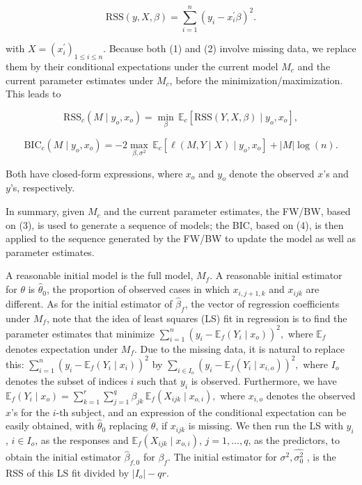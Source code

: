 \documentclass[
  12pt,
]{article}
\begin{document}
\begin{equation}
\text{RSS}(y, X, \beta)
= \sum_{i=1}^{n} (y_i - x_i^\prime \beta)^2. \tag{2}
\end{equation}

with \(X = (x^\prime_i)_{1 \le i \le n}\). Because both (1) and (2)
involve missing data, we replace them by their conditional expectations
under the current model \(M_c\) and the current parameter estimates
under \(M_c\), before the minimization/maximization. This leads to

\begin{equation}
\text{RSS}_c(M \mid y_o, x_o)
= \min_{\beta} \, \mathbb{E}_c \!\left[ \text{RSS}(Y, X, \beta) \mid y_o, x_o \right], \tag{3}
\end{equation}

\begin{equation}
\text{BIC}_c(M \mid y_o, x_o)
= -2 \max_{\beta, \sigma^2} \, \mathbb{E}_c \!\left[ \ell(M, Y \mid X) \mid y_o, x_o \right]
+ |M| \log(n). \tag{4}
\end{equation}

Both have closed-form expressions, where \(x_o\) and \(y_o\)
denote the observed \(x\)'s and \(y\)'s, respectively.

In summary, given \(M_c\) and the current parameter estimates, the
FW/BW, based on (3), is used to generate a sequence of models; the BIC,
based on (4), is then applied to the sequence generated by the FW/BW to
update the model as well as parameter estimates.

A reasonable initial model is the full model, \(M_f\). A reasonable
initial estimator for \(\theta\) is \(\hat{\theta}_0\), the proportion
of observed cases in which \(x_{i,j+1,k}\) and \(x_{ijk}\) are
different. As for the initial estimator of \(\hat{\beta}_f\), the vector
of regression coefficients under \(M_f\), note that the idea of least
squares (LS) fit in regression is to find the parameter estimates that
minimize \(\sum_{i=1}^{n} (y_i - \mathbb{E}_f(Y_i \mid x_o))^2,\) where
\(\mathbb{E}_f\) denotes expectation under \(M_f\). Due to the missing
data, it is natural to replace this:
\(\sum_{i=1}^{n} (y_i - \mathbb{E}_f(Y_i \mid x_i))^2\) by
\(\sum_{i \in I_o} (y_i - \mathbb{E}_f(Y_i \mid x_{i,o}))^2,\) where
\(I_o\) denotes the subset of indices \(i\) such that \(y_i\) is
observed. Furthermore, we have
\(\mathbb{E}_f(Y_i \mid x_{o})= \sum_{k=1}^{r} \sum_{j=1}^{q} \beta_{jk} \, \mathbb{E}_f(X_{ijk} \mid x_{o,i}),\)
where \(x_{i,o}\) denotes the observed \(x\)'s for the \(i\)-th subject,
and an expression of the conditional expectation can be easily obtained,
with \(\hat{\theta}_0\) replacing \(\theta\), if \(x_{ijk}\) is missing.
We then run the LS with \(y_i\), \(i \in I_o\), as the responses and
\(\mathbb{E}_f(X_{ijk} \mid x_{o,i})\), \(j = 1, \ldots, q\), as the
predictors, to obtain the initial estimator \(\hat{\beta}_{f,0}\) for
\(\beta_f\). The initial estimator for \(\sigma^2 , \hat{\sigma^2_0}\) ,
is the RSS of this LS fit divided by \(|I_o| - qr\).
\end{document}
